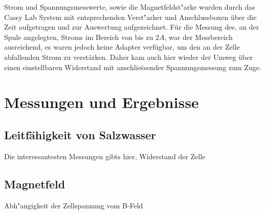 \documentclass[11pt]{scrartcl}
\begin{document}
Strom und Spannungsmesswerte, sowie die Magnetfeldst"arke wurden durch das Cassy Lab System mit entsprechenden Verst"arker und Anschlussboxen \"uber die Zeit aufgetragen und zur Auswertung aufgezeichnet. F\"ur die Messung des, an der Spule angelegten, Stroms im Bereich von bis zu $2A$, war der Messbereich ausreichend, es waren jedoch keine Adapter verf\"ugbar, um den an der Zelle abfallenden Strom zu verst\"arken. Daher kam auch hier wieder der Umweg \"uber einen einstellbaren Widerstand mit anschlie\"ssender Spannungsmessung zum Zuge.





\section{Messungen und Ergebnisse}

\subsection{Leitfähigkeit von Salzwasser}\label{leit}		%
Die interessantesten Messungen gibts hier, Widerstand der Zelle

\subsection{Magnetfeld}			%
Abh"angigkeit der Zellspannung vom B-Feld
\end{document}
